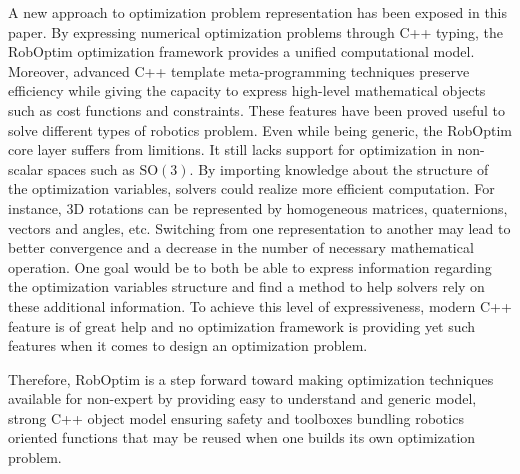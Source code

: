 \documentclass[conference,final,a4paper,twocolumn,9pt]{IEEEtran}
\begin{document}
A new approach to optimization problem representation has been exposed
in this paper. By expressing numerical optimization problems through
C++ typing, the RobOptim optimization framework provides a unified
computational model. Moreover, advanced C++ template meta-programming
techniques preserve efficiency while giving the capacity to express
high-level mathematical objects such as cost functions and
constraints. These features have been proved useful to solve different
types of robotics problem. Even while being generic, the RobOptim core
layer suffers from limitions. It still lacks support for optimization
in non-scalar spaces such as $\text{SO}(3)$. By importing knowledge
about the structure of the optimization variables, solvers could
realize more efficient computation. For instance, \mbox{3D} rotations
can be represented by homogeneous matrices, quaternions, vectors and
angles, etc. Switching from one representation to another may lead to
better convergence and a decrease in the number of necessary
mathematical operation. One goal would be to both be able to express
information regarding the optimization variables structure and find a
method to help solvers rely on these additional information. To
achieve this level of expressiveness, modern C++ feature is of great
help and no optimization framework is providing yet such features when
it comes to design an optimization problem.


Therefore, RobOptim is a step forward toward making optimization
techniques available for non-expert by providing easy to understand
and generic model, strong C++ object model ensuring safety and
toolboxes bundling robotics oriented functions that may be reused when
one builds its own optimization problem.




\end{document}

